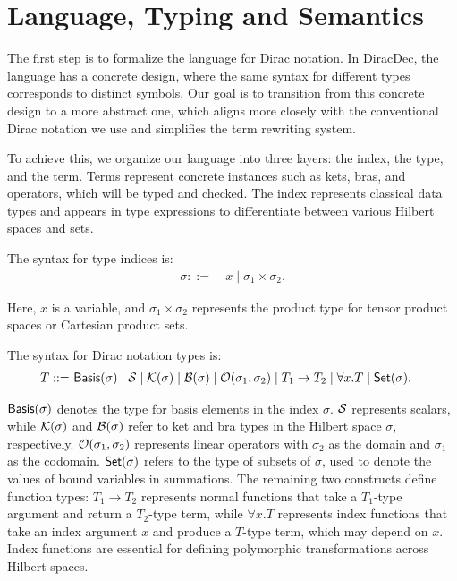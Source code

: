 
\section{Language, Typing and Semantics}
The first step is to formalize the language for Dirac notation. In DiracDec, the language has a concrete design, where the same syntax for different types corresponds to distinct symbols. Our goal is to transition from this concrete design to a more abstract one, which aligns more closely with the conventional Dirac notation we use and simplifies the term rewriting system.

To achieve this, we organize our language into three layers: the index, the type, and the term. Terms represent concrete instances such as kets, bras, and operators, which will be typed and checked. The index represents classical data types and appears in type expressions to differentiate between various Hilbert spaces and sets.

\begin{definition}
    The syntax for type indices is:
    \begin{align*}
        \sigma ::=\ & x \mid \sigma_1 \times \sigma_2.
    \end{align*}
\end{definition}
Here, \( x \) is a variable, and \( \sigma_1 \times \sigma_2 \) represents the product type for tensor product spaces or Cartesian product sets.

\begin{definition}
    The syntax for Dirac notation types is:
    \begin{align*}
        T ::=\ & \mathsf{Basis}(\sigma) \mid \mathcal{S} \mid \mathcal{K}(\sigma) \mid \mathcal{B}(\sigma) \mid \mathcal{O}(\sigma_1, \sigma_2) \mid T_1 \to T_2 \mid \forall x.T \mid \mathsf{Set}(\sigma).
    \end{align*}
\end{definition}
\( \mathsf{Basis}(\sigma) \) denotes the type for basis elements in the index \( \sigma \).
\( \mathcal{S} \) represents scalars, while \( \mathcal{K}(\sigma) \) and \( \mathcal{B}(\sigma) \) refer to ket and bra types in the Hilbert space \( \sigma \), respectively.
\( \mathcal{O}(\sigma_1, \sigma_2) \) represents linear operators with \( \sigma_2 \) as the domain and \( \sigma_1 \) as the codomain.
\( \mathsf{Set}(\sigma) \) refers to the type of subsets of \( \sigma \), used to denote the values of bound variables in summations.
The remaining two constructs define function types: \( T_1 \to T_2 \) represents normal functions that take a \( T_1 \)-type argument and return a \( T_2 \)-type term, while \( \forall x. T \) represents index functions that take an index argument \( x \) and produce a \( T \)-type term, which may depend on \( x \).
Index functions are essential for defining polymorphic transformations across Hilbert spaces.


